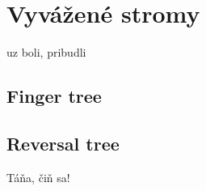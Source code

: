 \section{Vyvážené stromy}

uz boli, pribudli 
\subsection{Finger tree}
\subsection{Reversal tree}
Táňa, čiň sa! 
